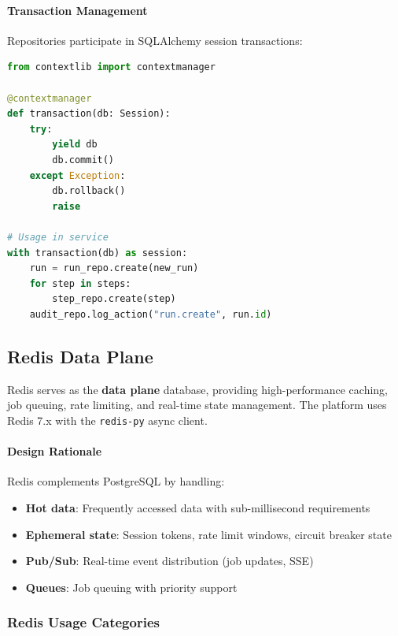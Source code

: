 \paragraph{Transaction Management}
Repositories participate in SQLAlchemy session transactions:

\begin{lstlisting}[language=Python, caption={Transaction management in service layer.}]
from contextlib import contextmanager

@contextmanager
def transaction(db: Session):
    try:
        yield db
        db.commit()
    except Exception:
        db.rollback()
        raise

# Usage in service
with transaction(db) as session:
    run = run_repo.create(new_run)
    for step in steps:
        step_repo.create(step)
    audit_repo.log_action("run.create", run.id)
\end{lstlisting}

\subsection{Redis Data Plane}
\label{subsec:redis}

Redis serves as the \textbf{data plane} database, providing high-performance caching, job queuing, rate limiting, and real-time state management. The platform uses Redis 7.x with the \texttt{redis-py} async client.

\paragraph{Design Rationale}
Redis complements PostgreSQL by handling:
\begin{itemize}
    \item \textbf{Hot data}: Frequently accessed data with sub-millisecond requirements
    \item \textbf{Ephemeral state}: Session tokens, rate limit windows, circuit breaker state
    \item \textbf{Pub/Sub}: Real-time event distribution (job updates, SSE)
    \item \textbf{Queues}: Job queuing with priority support
\end{itemize}

\subsubsection{Redis Usage Categories}
\label{subsubsec:redis-usage}

